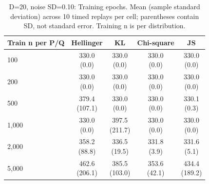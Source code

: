 \begin{table}[t]
\centering
\small
\setlength{\tabcolsep}{4pt}
\caption{D=20, noise SD=0.10: Training epochs. Mean (sample standard deviation) across 10 timed replays per cell; parentheses contain SD, not standard error. Training n is per distribution.}
\label{tab:sim-d-20-noise-sd-0-10-training-epochs}
\begin{tabular}{lcccc}
\toprule
Train n per P/Q & Hellinger & KL & Chi-square & JS \\
\midrule
100 & \shortstack{330.0\\(0.0)} & \shortstack{330.0\\(0.0)} & \shortstack{330.0\\(0.0)} & \shortstack{330.0\\(0.0)} \\
200 & \shortstack{330.0\\(0.0)} & \shortstack{330.0\\(0.0)} & \shortstack{330.0\\(0.0)} & \shortstack{330.0\\(0.0)} \\
500 & \shortstack{379.4\\(107.1)} & \shortstack{330.0\\(0.0)} & \shortstack{330.0\\(0.0)} & \shortstack{330.1\\(0.3)} \\
1,000 & \shortstack{330.0\\(0.0)} & \shortstack{397.5\\(211.7)} & \shortstack{330.0\\(0.0)} & \shortstack{330.0\\(0.0)} \\
2,000 & \shortstack{358.2\\(88.8)} & \shortstack{336.5\\(19.5)} & \shortstack{331.8\\(3.9)} & \shortstack{331.6\\(5.1)} \\
5,000 & \shortstack{462.6\\(206.1)} & \shortstack{385.5\\(103.0)} & \shortstack{353.6\\(42.1)} & \shortstack{434.4\\(189.2)} \\
\bottomrule
\end{tabular}
\end{table}

